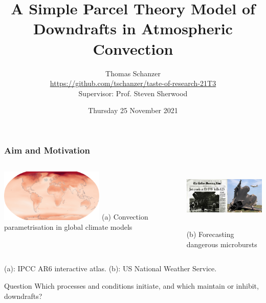 \documentclass{beamer}
\title{A Simple Parcel Theory Model of Downdrafts in Atmospheric Convection}
\author{
    Thomas Schanzer
    \texorpdfstring{\\}{}
    \small \texorpdfstring{
        \url{https://github.com/tschanzer/taste-of-research-21T3}}{
        https://github.com/tschanzer/taste-of-research-21T3
    }
    \texorpdfstring{\\ \vspace{5mm}}{}
    Supervisor: Prof. Steven Sherwood}
\institute{UNSW School of Physics}
\date{Thursday 25 November 2021}
\begin{document}
\frame{\titlepage}

\begin{frame}
    \frametitle{Aim and Motivation}

    \begin{columns}
    \begin{column}{0.5\textwidth}
        \vspace{3mm}

        \includegraphics[height=2.5cm]{figures/ipcc_model_temp_cropped.png}
        \centering \footnotesize
        {\color{blue} (a)} Convection parametrisation in global climate models
    \end{column}
    \begin{column}{0.5\textwidth}
        \hspace{-7mm}%
        \includegraphics[height=2.5cm]{figures/delta191_side.png}

        \hspace{-11mm}%
        \centering \footnotesize
        {\color{blue} (b)} Forecasting dangerous microbursts
    \end{column}
    \end{columns}

    \begin{center}
        \tiny \color{gray} (a): IPCC AR6 interactive atlas.
        (b): US National Weather Service.
    \end{center}

    \pause
    \begin{block}{Question}
        Which processes and conditions initiate, and which
        maintain or inhibit, downdrafts?
    \end{block}
    \vspace{5mm}
\end{frame}
\end{document}

